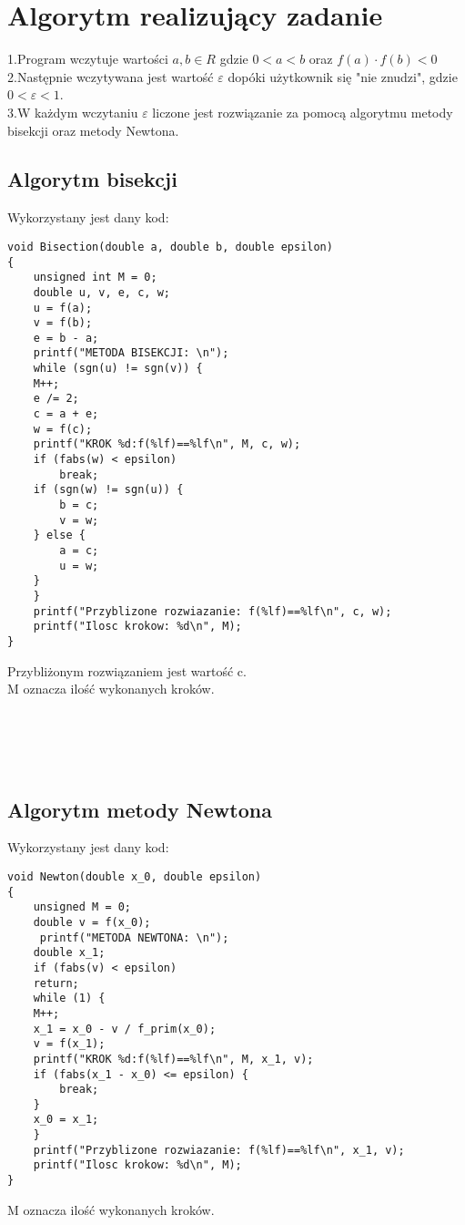 \documentclass[11pt]{article} %
\begin{document}
\section {Algorytm realizujący zadanie}
1.Program wczytuje wartości $a,b \in R$ gdzie $0<a<b$ oraz $f(a) \cdot f(b) < 0$ \\
2.Następnie wczytywana jest wartość $\varepsilon$ dopóki użytkownik się "nie znudzi", gdzie \\ $0<\varepsilon<1$. \\
3.W każdym wczytaniu $\varepsilon$ liczone jest rozwiązanie za pomocą algorytmu metody bisekcji oraz metody Newtona.
\subsection {Algorytm bisekcji}
Wykorzystany jest dany kod:
\begin{lstlisting}[firstnumber=100]
void Bisection(double a, double b, double epsilon)
{
    unsigned int M = 0;
    double u, v, e, c, w;
    u = f(a);
    v = f(b);
    e = b - a;
    printf("METODA BISEKCJI: \n");
    while (sgn(u) != sgn(v)) {
	M++;
	e /= 2;
	c = a + e;
	w = f(c);
	printf("KROK %d:f(%lf)==%lf\n", M, c, w);
	if (fabs(w) < epsilon)
	    break;
	if (sgn(w) != sgn(u)) {
	    b = c;
	    v = w;
	} else {
	    a = c;
	    u = w;
	}
    }
    printf("Przyblizone rozwiazanie: f(%lf)==%lf\n", c, w);
    printf("Ilosc krokow: %d\n", M);
}
\end{lstlisting}
Przybliżonym rozwiązaniem jest wartość c. \\ M oznacza ilość wykonanych kroków.\\\\\\\\\\
\subsection {Algorytm metody Newtona}
Wykorzystany jest dany kod:
\lstset{language=C}
\begin{lstlisting}[firstnumber=100]
void Newton(double x_0, double epsilon)
{
    unsigned M = 0;
    double v = f(x_0);
     printf("METODA NEWTONA: \n");
    double x_1;
    if (fabs(v) < epsilon)
	return;
    while (1) {
	M++;
	x_1 = x_0 - v / f_prim(x_0);
	v = f(x_1);
	printf("KROK %d:f(%lf)==%lf\n", M, x_1, v);
	if (fabs(x_1 - x_0) <= epsilon) {
	    break;
	}
	x_0 = x_1;
    }
    printf("Przyblizone rozwiazanie: f(%lf)==%lf\n", x_1, v);
    printf("Ilosc krokow: %d\n", M);
}
\end{lstlisting}
 M oznacza ilość wykonanych kroków.
\end{document}
